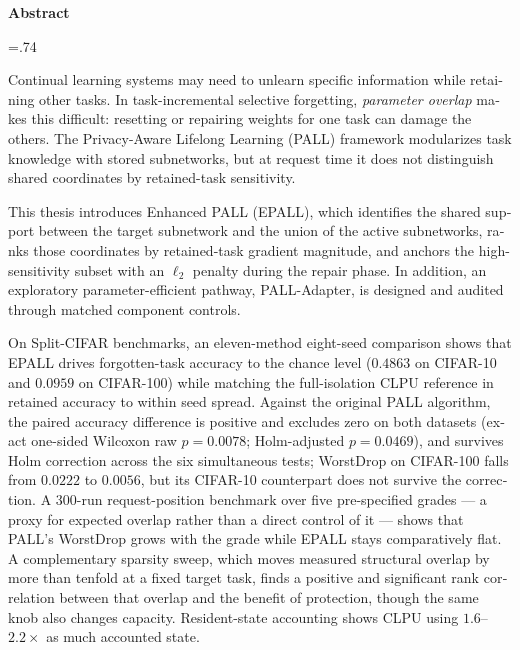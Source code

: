 

\begin{latin}

	\begin{center}
		\textbf{Abstract}
	\end{center}
	\baselineskip=.74\baselineskip

	Continual learning systems may need to unlearn specific information while retaining other tasks. In task-incremental selective forgetting, \emph{parameter overlap} makes this difficult: resetting or repairing weights for one task can damage the others. The Privacy-Aware Lifelong Learning (PALL) framework modularizes task knowledge with stored subnetworks, but at request time it does not distinguish shared coordinates by retained-task sensitivity.

	This thesis introduces Enhanced PALL (EPALL), which identifies the shared support between the target subnetwork and the union of the active subnetworks, ranks those coordinates by retained-task gradient magnitude, and anchors the high-sensitivity subset with an $\ell_2$ penalty during the repair phase. In addition, an exploratory parameter-efficient pathway, PALL-Adapter, is designed and audited through matched component controls.

	On Split-CIFAR benchmarks, an eleven-method eight-seed comparison shows that EPALL drives forgotten-task accuracy to the chance level ($0.4863$ on CIFAR-10 and $0.0959$ on CIFAR-100) while matching the full-isolation CLPU reference in retained accuracy to within seed spread. Against the original PALL algorithm, the paired accuracy difference is positive and excludes zero on both datasets (exact one-sided Wilcoxon raw $p=0.0078$; Holm-adjusted $p=0.0469$), and survives Holm correction across the six simultaneous tests; WorstDrop on CIFAR-100 falls from $0.0222$ to $0.0056$, but its CIFAR-10 counterpart does not survive the correction. A $300$-run request-position benchmark over five pre-specified grades --- a proxy for expected overlap rather than a direct control of it --- shows that PALL's WorstDrop grows with the grade while EPALL stays comparatively flat. A complementary sparsity sweep, which moves measured structural overlap by more than tenfold at a fixed target task, finds a positive and significant rank correlation between that overlap and the benefit of protection, though the same knob also changes capacity. Resident-state accounting shows CLPU using $1.6$--$2.2\times$ as much accounted state.


\end{latin}
